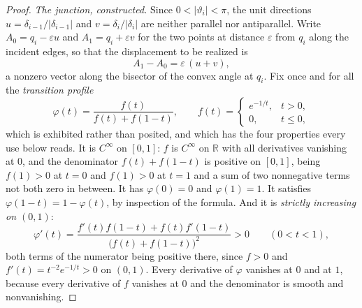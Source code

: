 \begin{proof}\leanok{}
\emph{The junction, constructed.} Since $0<|\vartheta_i|<\pi$, the unit directions
$u=\delta_{i-1}/|\delta_{i-1}|$ and $v=\delta_i/|\delta_i|$ are neither parallel
nor antiparallel. Write $A_0=q_i-\varepsilon u$ and $A_1=q_i+\varepsilon v$ for
the two points at distance $\varepsilon$ from $q_i$ along the incident edges, so
that the displacement to be realized is
\[
   A_1-A_0=\varepsilon\,(u+v),
\]
a nonzero vector along the bisector of the convex angle at $q_i$. Fix once and
for all the \emph{transition profile}
\[
   \varphi(t)=\frac{f(t)}{f(t)+f(1-t)},
   \qquad
   f(t)=\begin{cases} e^{-1/t}, & t>0,\\ 0,& t\leq0,\end{cases}
\]
which is exhibited rather than posited, and which has the four properties every
use below reads. It is $C^\infty$ on $[0,1]$: $f$ is $C^\infty$ on $\mathbb R$
with all derivatives vanishing at $0$, and the denominator
$f(t)+f(1-t)$ is positive on $[0,1]$, being $f(1)>0$ at $t=0$ and $f(1)>0$ at
$t=1$ and a sum of two nonnegative terms not both zero in between. It has
$\varphi(0)=0$ and $\varphi(1)=1$. It satisfies $\varphi(1-t)=1-\varphi(t)$, by
inspection of the formula. And it is \emph{strictly increasing on $(0,1)$}:
\[
   \varphi'(t)=\frac{f'(t)f(1-t)+f(t)f'(1-t)}{\bigl(f(t)+f(1-t)\bigr)^2}>0
   \qquad (0<t<1),
\]
both terms of the numerator being positive there, since $f>0$ and
$f'(t)=t^{-2}e^{-1/t}>0$ on $(0,1)$. Every derivative of $\varphi$ vanishes at
$0$ and at $1$, because every derivative of $f$ vanishes at $0$ and the
denominator is smooth and nonvanishing.


\end{proof}
